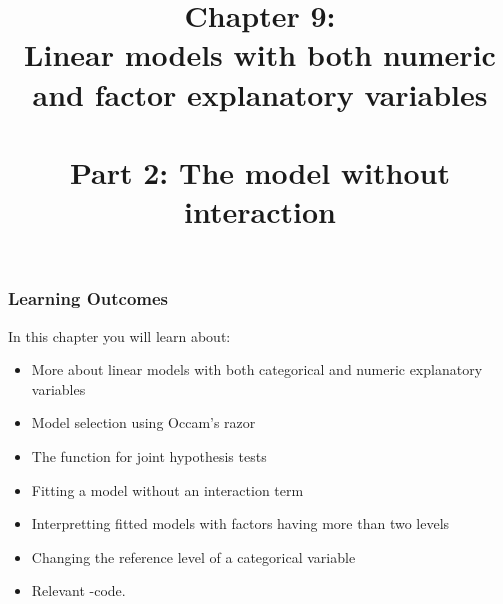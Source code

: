 \documentclass{beamer}\usepackage[]{graphicx}\usepackage[]{xcolor}
\begin{document}
\newcommand{\thechapter}{9}

\title{Chapter 9: \\ Linear models with both numeric and factor explanatory variables \\~\\ Part 2: The model without interaction}


\begin{frame}
\titlepage
\end{frame}

\begin{frame}[t]
\frametitle{Learning Outcomes}
In this chapter you will learn about:
\begin{center}
\vspace{16pt}
\begin{minipage}{0.9\textwidth}
  \begin{itemize}
  \item More about linear models with both categorical and numeric explanatory variables
  \item Model selection using Occam's razor
  \item The  function for joint hypothesis tests
  \item Fitting a model without an interaction term
  \item Interpretting fitted models with factors having more than two levels 
  \item Changing the reference level of a categorical variable
  \item Relevant -code.
  \end{itemize}
\end{minipage}
\end{center}
\end{frame}


\end{document}
